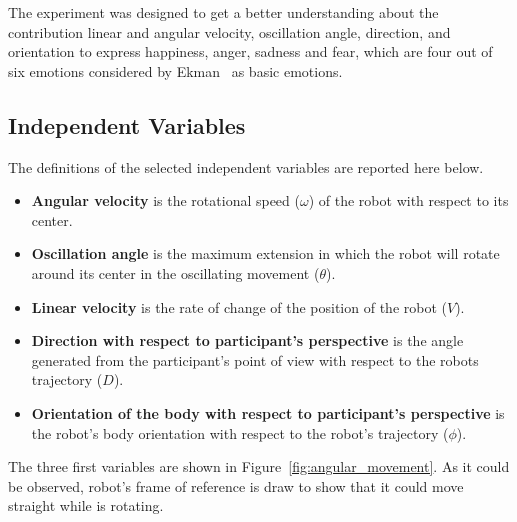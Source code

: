 
The experiment was designed to get a better understanding about the contribution linear and angular velocity, oscillation angle, direction, and orientation to express happiness, anger, sadness and fear, which are four out of six emotions considered by Ekman~\cite{Ekman2004} as basic emotions.

\subsection{Independent Variables}

The definitions of the selected independent variables are reported here below.

\begin{itemize}
	\item \textbf{Angular velocity} is the rotational speed  ($\omega$) of the robot with respect to its center.

	\item \textbf{Oscillation angle} is the maximum extension in which the robot will rotate around its center in the oscillating movement ($\theta$).

	\item \textbf{Linear velocity} is the rate of change of the position of the robot ($V$). 

	\item \textbf{Direction with respect to participant's perspective} is the angle generated from the participant's point of view with respect to the robots trajectory ($D$).

	\item \textbf{Orientation of the body with respect to participant's perspective} is the robot's body orientation with respect to the robot's trajectory ($\phi$).

\end{itemize}

The three first variables are shown in Figure~\ref{fig:angular_movement}. As it could be observed, robot's frame of reference is draw to show that it could move straight while is rotating.


